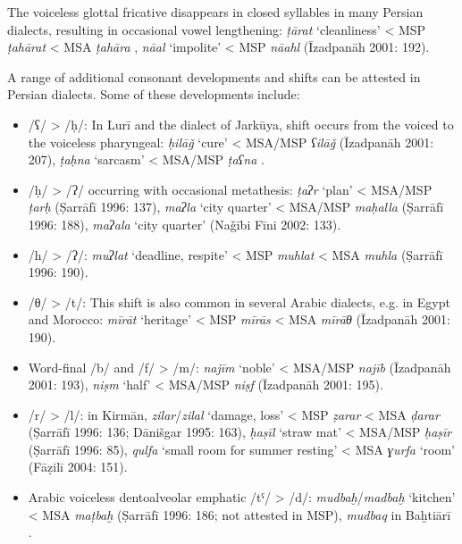 \documentclass[output=paper]{langsci/langscibook}
\begin{document}

The voiceless glottal fricative disappears in closed syllables in many Persian dialects, resulting in occasional vowel lengthening: \textit{ṭārat} ‘cleanliness’ < MSP \textit{ṭahārat} < MSA \textit{ṭahāra} \citep[76]{Sarlak2002}, \textit{nāal} ‘impolite’ < MSP \textit{nāahl} (Īzadpanāh 2001: 192).


A range of additional consonant developments and shifts can be attested in Persian dialects. Some of these developments include:

\begin{itemize}
\item 
/ʕ/ > /ḥ/: In Lurī and the dialect of Jarkūya, shift occurs from the voiced to the voiceless pharyngeal: \textit{ḥilāǧ} ‘cure’ < MSA/MSP \textit{ʕilāǧ} (Īzadpanāh 2001: 207), \textit{ṭaḥna} ‘sarcasm’ < MSA/MSP \textit{ṭaʕna} \citep{Borjian2008}.

\item
/ḥ/ > /ʔ/ occurring with occasional metathesis: \textit{ṭaʔr} ‘plan’ < MSA/MSP \textit{ṭarḥ} (Ṣarrāfī 1996: 137), \textit{maʔla} ‘city quarter’ < MSA/MSP \textit{maḥalla} (Ṣarrāfī 1996: 188), \textit{maʔala} ‘city quarter’ (Naǧībi Fīni 2002: 133).

\item
/h/ > /ʔ/: \textit{muʔlat} ‘deadline, respite’ < MSP \textit{muhlat} < MSA \textit{muhla} (Ṣarrāfī 1996: 190).

\item
/θ/ > /t/: This shift is also common in several Arabic dialects, e.g. in Egypt and Morocco: \textit{mīrāt} ‘heritage’ < MSP \textit{mīrās} < MSA \textit{mīrāθ} (Īzadpanāh 2001: 190).

\item
Word-final /b/ and /f/ > /m/: \textit{najīm} ‘noble’ < MSA/MSP \textit{najīb} (Īzadpanāh 2001: 193), \textit{niṣm} ‘half’ < MSA/MSP \textit{niṣf} (Īzadpanāh 2001: 195).

\item
/r/ > /l/: in Kirmān, \textit{zilar}/\textit{zilal} ‘damage, loss’ < MSP \textit{ẓarar} < MSA \textit{ḍarar} (Ṣarrāfī 1996: 136; Dānišgar 1995: 163), \textit{ḥaṣīl} ‘straw mat’ < MSA/MSP \textit{ḥaṣīr} (Ṣarrāfī 1996: 85), \textit{qulfa} ‘small room for summer resting’ < MSA \textit{ɣurfa} ‘room’ (Fāẓilī 2004: 151).

\item
Arabic voiceless dentoalveolar emphatic /tˤ/ > /d/: \textit{mudbaḫ}/\textit{madbaḫ} ‘kitchen’ < MSA \textit{maṭbaḫ} (Ṣarrāfī 1996: 186; not attested in MSP), \textit{mudbaq} in Baḫtiārī \citep[251]{Sarlak2002}.


\end{itemize}
\end{document}

